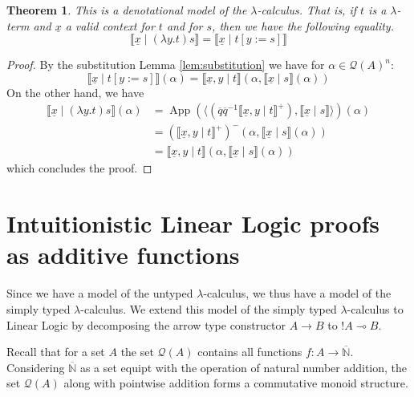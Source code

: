 \documentclass[12pt]{article}
\theoremstyle{plain}
\newtheorem{thm}{Theorem}[subsection] %
\theoremstyle{definition}
\newcommand{\bb}[1]{\mathbb{#1}}
\newcommand{\barN}{\overline{\bb{N}}}
\newcommand{\call}[1]{\mathcal{#1}}
\newcommand{\Qcal}{\call{Q}}
\newcommand{\lto}{\longrightarrow}
\begin{document}
	\begin{thm}\label{thm:denotational_model}
		This is a denotational model of the $\lambda$-calculus. That is, if $t$ is a $\lambda$-term and $\underline{x}$ a valid context for $t$ and for $s$, then we have the following equality.
		\begin{equation}
			\llbracket \underline{x} \mid (\lambda y. t)s\rrbracket = \llbracket \underline{x} \mid t[y:=s]\rrbracket
			\end{equation}
		\end{thm}
	
	\begin{proof}
		By the substitution Lemma \ref{lem:substitution} we have for $\alpha \in \Qcal(A)^n$:
		\begin{equation}
			\llbracket \underline{x} \mid t[y:=s]\rrbracket(\alpha) = \llbracket \underline{x}, y \mid t\rrbracket(\alpha, \llbracket \underline{x} \mid s \rrbracket(\alpha))
			\end{equation}
		On the other hand, we have
		\begin{align*}
			\llbracket \underline{x} \mid (\lambda y.t)s\rrbracket(\alpha) &= \operatorname{App}(\big\langle (\overline{q} \overline{q}^{-1}\llbracket \underline{x}, y \mid t \rrbracket^+), \llbracket \underline{x} \mid s \rrbracket\big\rangle)(\alpha)\\
			&=(\llbracket \underline{x}, y \mid t\rrbracket^+)^-(\alpha, \llbracket\underline{x} \mid s \rrbracket(\alpha))\\
			&= \llbracket \underline{x}, y \mid t \rrbracket (\alpha, \llbracket \underline{x} \mid s \rrbracket(\alpha))
			\end{align*}
		which concludes the proof.
		\end{proof}
	
\section{Intuitionistic Linear Logic proofs as additive functions}
	Since we have a model of the untyped $\lambda$-calculus, we thus have a model of the simply typed $\lambda$-calculus. We extend this model of the simply typed $\lambda$-calculus to Linear Logic by decomposing the arrow type constructor $A \lto B$ to $!A \multimap B$.
	
	Recall that for a set $A$ the set $\Qcal(A)$ contains all functions $f: A \lto \barN$. Considering $\barN$ as a set equipt with the operation of natural number addition, the set $\Qcal(A)$ along with pointwise addition forms a commutative monoid structure.
	
\end{document}
